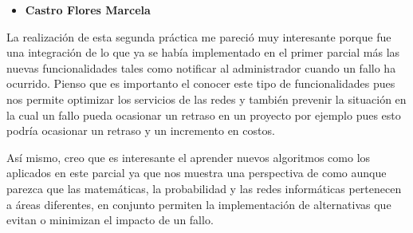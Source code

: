 \begin{itemize}
\item \textbf{Castro Flores Marcela}
\end{itemize}

La realización de esta segunda práctica me pareció muy interesante porque fue una integración de lo que ya se había implementado en el primer parcial más las nuevas funcionalidades tales como notificar al administrador cuando un fallo ha ocurrido.
Pienso que es importanto el conocer este tipo de funcionalidades pues nos permite optimizar los servicios de las redes y también prevenir la situación en la cual un fallo pueda ocasionar un retraso en un proyecto por ejemplo pues esto podría ocasionar un retraso y un incremento en costos.
\\ \par
Así mismo, creo que es interesante el aprender nuevos algoritmos como los aplicados en este parcial ya que nos muestra una perspectiva de como aunque parezca que las matemáticas, la probabilidad y las redes informáticas pertenecen a áreas diferentes, en conjunto permiten la implementación de alternativas que evitan o minimizan el impacto de un fallo.